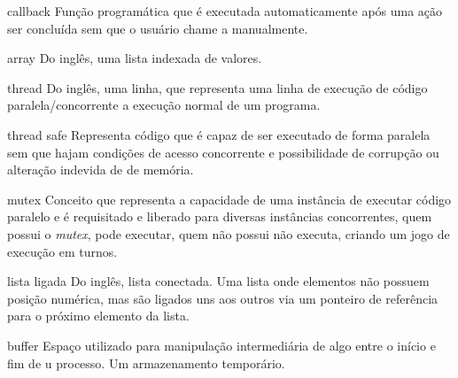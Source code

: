 \begin{siglas}
    \item[callback]          Função programática que é executada automaticamente após uma ação ser concluída sem que o usuário chame a manualmente. 
    \item[array]             Do inglês, uma lista indexada de valores. 
    \item[thread]            Do inglês, uma linha, que representa uma linha de execução de código paralela/concorrente a execução normal de um programa.
    \item[thread safe]       Representa código que é capaz de ser executado de forma paralela sem que hajam condições de acesso concorrente e possibilidade de corrupção ou alteração indevida de de memória.
    \item[mutex]             Conceito que representa a capacidade de uma instância de executar código paralelo e é requisitado e liberado para diversas instâncias concorrentes, quem possui o \textit{mutex}, pode executar, quem não possui não executa, criando um jogo de execução em turnos.  
    \item[lista ligada]       Do inglês, lista conectada. Uma lista onde elementos não possuem posição numérica, mas são ligados uns aos outros via um ponteiro de referência para o próximo elemento da lista.
    \item[buffer]            Espaço utilizado para manipulação intermediária de algo entre o início e fim de u processo. Um armazenamento temporário.   

\end{siglas}


\tableofcontents*
\cleardoublepage